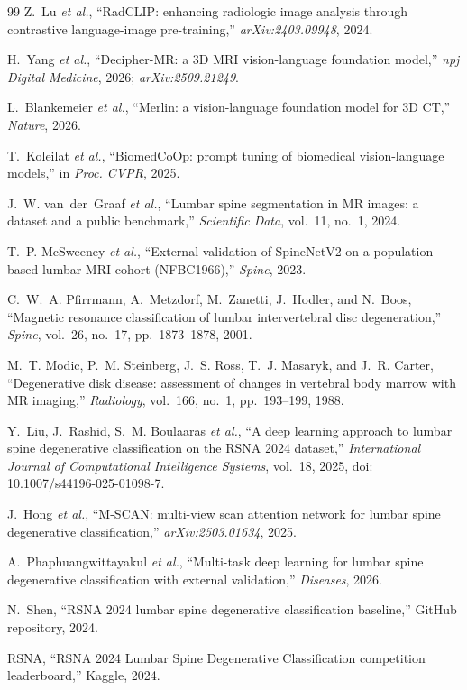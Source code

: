 \documentclass[conference]{IEEEtran}
\begin{document}
\begin{thebibliography}{99}
Z.~Lu \textit{et al.},
``RadCLIP: enhancing radiologic image analysis through contrastive
language-image pre-training,''
\textit{arXiv:2403.09948}, 2024.

H.~Yang \textit{et al.},
``Decipher-MR: a 3D MRI vision-language foundation model,''
\textit{npj Digital Medicine}, 2026;\newline
\textit{arXiv:2509.21249}.

L.~Blankemeier \textit{et al.},
``Merlin: a vision-language foundation model for 3D CT,''
\textit{Nature}, 2026.

T.~Koleilat \textit{et al.},
``BiomedCoOp: prompt tuning of biomedical vision-language models,''
in \textit{Proc. CVPR}, 2025.

J.~W. van~der~Graaf \textit{et al.},
``Lumbar spine segmentation in MR images: a dataset and a public
benchmark,''
\textit{Scientific Data}, vol.~11, no.~1, 2024.

T.~P. McSweeney \textit{et al.},
``External validation of SpineNetV2 on a population-based lumbar MRI
cohort (NFBC1966),''
\textit{Spine}, 2023.

C.~W.~A. Pfirrmann, A.~Metzdorf, M.~Zanetti, J.~Hodler, and
N.~Boos,
``Magnetic resonance classification of lumbar intervertebral disc
degeneration,''
\textit{Spine}, vol.~26, no.~17, pp.~1873--1878, 2001.

M.~T. Modic, P.~M. Steinberg, J.~S. Ross, T.~J. Masaryk, and
J.~R. Carter,
``Degenerative disk disease: assessment of changes in vertebral body
marrow with MR imaging,''
\textit{Radiology}, vol.~166, no.~1, pp.~193--199, 1988.

Y.~Liu, J.~Rashid, S.~M. Boulaaras \textit{et al.},
``A deep learning approach to lumbar spine degenerative classification
on the RSNA 2024 dataset,''
\textit{International Journal of Computational Intelligence Systems},
vol.~18, 2025, doi: 10.1007/s44196-025-01098-7.

J.~Hong \textit{et al.},
``M-SCAN: multi-view scan attention network for lumbar spine
degenerative classification,''
\textit{arXiv:2503.01634}, 2025.

A.~Phaphuangwittayakul \textit{et al.},
``Multi-task deep learning for lumbar spine degenerative
classification with external validation,''
\textit{Diseases}, 2026.

N.~Shen,
``RSNA 2024 lumbar spine degenerative classification baseline,''
GitHub repository, 2024.

RSNA, ``RSNA 2024 Lumbar Spine Degenerative Classification
competition leaderboard,''
Kaggle, 2024.

\end{thebibliography}
\end{document}
